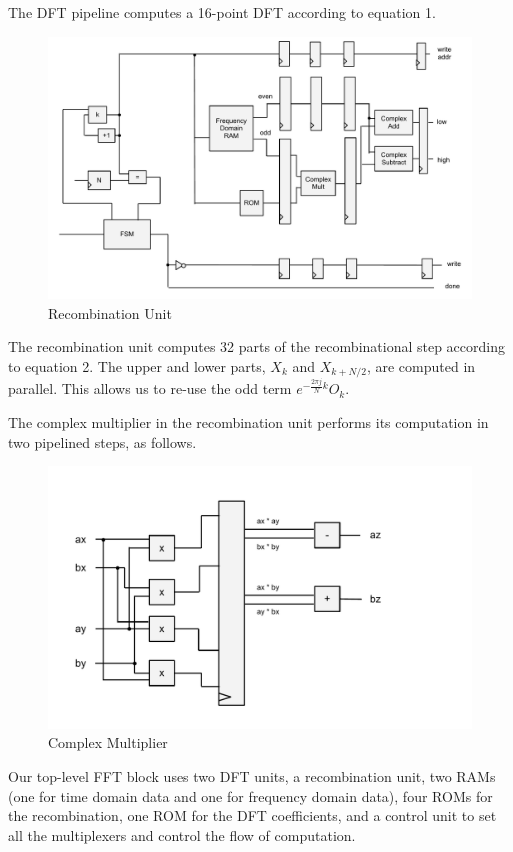 \documentclass{article}
\begin{document}
The DFT pipeline computes a 16-point DFT according to equation 1. 

\begin{figure}[H]
	\centering
	\includegraphics[scale=0.3]{recombinator}
	\caption{Recombination Unit}
\end{figure}

The recombination unit computes 32 parts of the recombinational step 
according to equation 2. The upper and lower parts, \(X_k\) and 
\(X_{k + N / 2}\), are computed in parallel. This allows us to re-use the 
odd term \(e^{-\frac{2\pi j}{N}k} O_k\).

The complex multiplier in the recombination unit performs its computation
in two pipelined steps, as follows.

\begin{figure}[H]
	\centering
	\includegraphics[scale=0.4]{complex-mult}
	\caption{Complex Multiplier}
\end{figure}

Our top-level FFT block uses two DFT units, a recombination unit,
two RAMs (one for time domain data and one for frequency domain data),
four ROMs for the recombination, one ROM for the DFT coefficients, and
a control unit to set all the multiplexers and control the flow of
computation.
\end{document}
